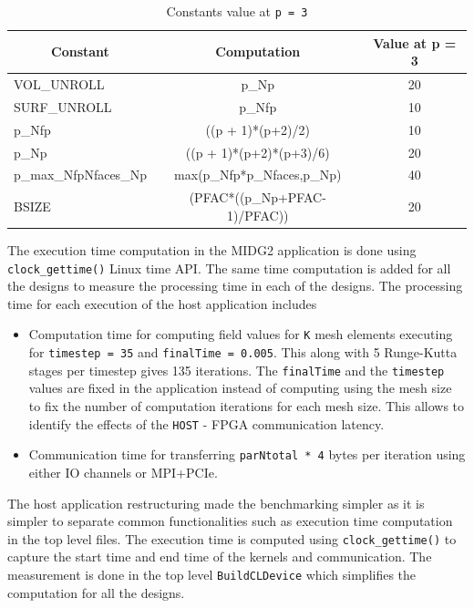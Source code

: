 \begin{table}[ht]
    \centering
    \caption{Constants value at \texttt{p = 3}}
    \label{tab:constants}
    \begin{tabular}{lcc}
    \multicolumn{1}{c}{\textbf{Constant}} & \multicolumn{1}{c}{\textbf{Computation}} & \multicolumn{1}{c}{\textbf{Value at p = 3}} \\
    \hline
    VOL\_UNROLL & p\_Np & 20 \\
    SURF\_UNROLL & p\_Nfp & 10\\
    p\_Nfp & ((p + 1)*(p+2)/2) & 10 \\
    p\_Np & ((p + 1)*(p+2)*(p+3)/6) & 20 \\
    p\_max\_NfpNfaces\_Np & max(p\_Nfp*p\_Nfaces,p\_Np) & 40 \\
    BSIZE & (PFAC*((p\_Np+PFAC-1)/PFAC)) & 20 \\
    \hline
    \end{tabular}%
\end{table}

The execution time computation in the MIDG2 application is done using \texttt{clock\_gettime()}
Linux time API. The same time computation is added for all the designs to
measure the processing time in each of the designs. The processing time
for each execution of the host application includes
\begin{itemize}
\item Computation time for computing field values for \texttt{K} mesh elements
executing for \texttt{timestep = 35} and \texttt{finalTime = 0.005}. This along
with 5 Runge-Kutta stages per timestep gives 135 iterations. The \texttt{finalTime}
and the \texttt{timestep} values are fixed in the application instead of
computing using the mesh size to fix the number of computation iterations for each
mesh size. This allows to identify the effects of the \texttt{HOST} - FPGA communication latency.
\item Communication time for transferring \texttt{parNtotal * 4} bytes per iteration
using either IO channels or MPI+PCIe.
\end{itemize}

The host application restructuring made the benchmarking simpler as it is
simpler to separate common functionalities such as execution time computation
in the top level files. The execution time is computed using \texttt{clock\_gettime()}
to capture the start time and end time of the kernels and communication. The measurement
is done in the top level \texttt{BuildCLDevice} which simplifies the computation
for all the designs.

